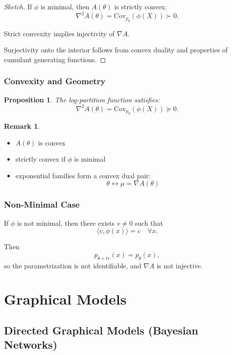 \documentclass[12pt,oneside]{book}
\numberwithin{equation}{section}
\theoremstyle{definition}
\newtheorem{remark}{Remark}[section]
\theoremstyle{plain}
\newtheorem{proposition}{Proposition}[section]
\theoremstyle{remark}
\begin{document}
\begin{proof}[Sketch]
If $\phi$ is minimal, then $A(\theta)$ is strictly convex:
\[
\nabla^2 A(\theta) = \mathrm{Cov}_{p_\theta}(\phi(X)) \succ 0.
\]

Strict convexity implies injectivity of $\nabla A$.

Surjectivity onto the interior follows from convex duality and properties of cumulant generating functions.
\end{proof}


\subsection{Convexity and Geometry}

\begin{proposition}
The log-partition function satisfies:
\[
\nabla^2 A(\theta) = \mathrm{Cov}_{p_\theta}(\phi(X)) \succeq 0.
\]
\end{proposition}

\begin{remark}
\begin{itemize}
\item $A(\theta)$ is convex
\item strictly convex if $\phi$ is minimal
\item exponential families form a convex dual pair:
\[
\theta \leftrightarrow \mu = \nabla A(\theta)
\]
\end{itemize}
\end{remark}


\subsection*{Non-Minimal Case}

If $\phi$ is not minimal, then there exists $v \neq 0$ such that
\[
\langle v, \phi(x)\rangle = c \quad \forall x.
\]

Then
\[
p_{\theta + t v}(x)
=
p_\theta(x),
\]
so the parametrization is not identifiable, and $\nabla A$ is not injective.

\chapter{Graphical Models}

\section{Directed Graphical Models (Bayesian Networks)}
\end{document}
